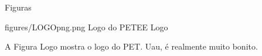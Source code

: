 Figuras

figures/LOGOpng.png 
Logo do PETEE
Logo

A Figura Logo mostra o logo do PET. Uau, é realmente muito bonito.